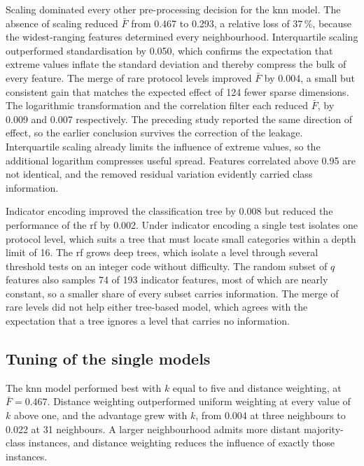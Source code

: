 Scaling dominated every other pre-processing decision for the \gls{knn}
model. The absence of scaling reduced $\bar{F}$ from 0.467 to 0.293, a
relative loss of $37\,\%$, because the widest-ranging features determined
every neighbourhood. Interquartile scaling outperformed standardisation by
0.050, which confirms the expectation that extreme values inflate the
standard deviation and thereby compress the bulk of every feature. The merge
of rare protocol levels improved $\bar{F}$ by 0.004, a small but consistent
gain that matches the expected effect of 124 fewer sparse dimensions. The
logarithmic transformation and the correlation filter each reduced $\bar{F}$,
by 0.009 and 0.007 respectively. The preceding study reported the same
direction of effect, so the earlier conclusion survives the correction of
the leakage. Interquartile
scaling already limits the influence of extreme values, so the additional
logarithm compresses useful spread. Features correlated above 0.95 are not
identical, and the removed residual variation evidently carried class
information.

Indicator encoding improved the classification tree by 0.008 but reduced
the performance of the \gls{rf} by 0.002. Under indicator encoding a single
test isolates one protocol level, which suits a tree that must locate small
categories within a depth limit of 16. The \gls{rf} grows deep trees, which
isolate a level through several threshold tests on an integer code without
difficulty. The random subset of $q$ features also samples 74 of 193
indicator features, most of which are nearly constant, so a smaller share
of every subset carries information. The merge of rare levels did not help
either tree-based model, which agrees with the expectation that a tree
ignores a level that carries no information.

\subsection{Tuning of the single models}
\label{sec:res-single}

The \gls{knn} model performed best with $k$ equal to five and distance
weighting, at $\bar{F} = 0.467$. Distance weighting outperformed uniform
weighting at every value of $k$ above one, and the advantage grew with $k$,
from 0.004 at three neighbours to 0.022 at 31 neighbours. A larger
neighbourhood admits more distant majority-class instances, and distance
weighting reduces the influence of exactly those instances.

